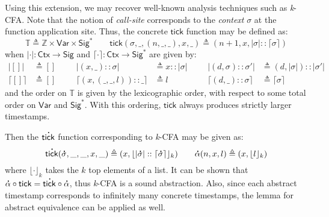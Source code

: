 \documentclass[acmsmall,screen,review]{acmart}\settopmatter{printfolios=true,printccs=false,printacmref=false}
\theoremstyle{acmdefinition}
\newcommand*{\cons}{::}
\newcommand*{\A}[1]{\overset{\,_{\mbox{\Large .}}}{#1}}
\newcommand*{\ExprVar}{\mathsf{Var}}
\newcommand*{\modid}{d}
\newcommand*{\Time}{\mathbb{T}}
\newcommand*{\ctx}{\sigma}
\newcommand*{\Ctx}{\mathsf{Ctx}}
\newcommand*{\Sig}{\mathsf{Sig}}
\newcommand*{\tick}{\mathsf{tick}}
\begin{document}
Using this extension, we may recover well-known analysis techniques such as \emph{k}-CFA.
Note that the notion of \emph{call-site} corresponds to the \emph{context} $\ctx$ at the function application site.
Thus, the concrete $\tick$ function may be defined as:
\[\Time\triangleq\mathbb{Z}\times\ExprVar\times\Sig^*\qquad\tick(\ctx,\_,(n,\_,\_),x,\_)\triangleq(n+1,x,|\ctx|\cons\lceil\ctx\rceil)\]
when $|\cdot|:\Ctx\rightarrow\Sig$ and $\lceil\cdot\rceil:\Ctx\rightarrow\Sig^*$ are given by:
\begin{align*}
  |[]|           & \triangleq [] &  &  & |(x,\_)\cons\ctx|                & \triangleq x\cons|\ctx| &  &  & |(\modid,\ctx)\cons\ctx'|        & \triangleq(\modid,|\ctx|)\cons|\ctx'| \\
  \lceil[]\rceil & \triangleq [] &  &  & \lceil(x,(\_,\_,l))\cons\_\rceil & \triangleq l            &  &  & \lceil(\modid,\_)\cons\ctx\rceil & \triangleq\lceil\ctx\rceil
\end{align*}
and the order on $\Time$ is given by the lexicographic order, with respect to some total order on $\ExprVar$ and $\Sig^*$.
With this ordering, $\tick$ always produces strictly larger timestamps.

Then the $\A\tick$ function corresponding to \emph{k}-CFA may be given as:
\[\A\tick(\A\ctx,\_,\_,x,\_)\triangleq(x,\lfloor|\A\ctx|\cons\lceil\A\ctx\rceil\rfloor_k)\qquad\A\alpha(n,x,l)\triangleq(x,\lfloor l\rfloor_k)\]
where $\lfloor\cdot\rfloor_k$ takes the $k$ top elements of a list.
It can be shown that $\A\alpha\circ\tick=\A\tick\circ\A\alpha$, thus \emph{k}-CFA is a sound abstraction.
Also, since each abstract timestamp corresponds to infinitely many concrete timestamps, the lemma for abstract equivalence can be applied as well.
\end{document}
